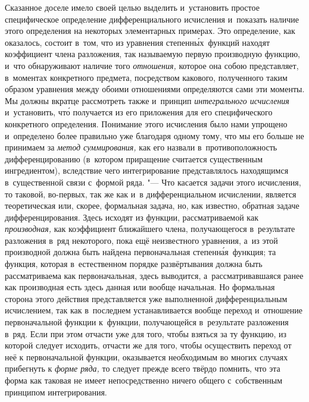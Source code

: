 Сказанное доселе имело своей целью выделить и~установить простое специфическое
определение дифференциального исчисления и~показать наличие этого определения
на некоторых элементарных примерах. Это определение, как оказалось, состоит
в~том, что из уравнения степенн\'{ы}х~функций находят коэффициент члена разложения,
так называемую первую производную функцию, и~что обнаруживают наличие того
{\em отношения,} которое она собою представляет, в~моментах конкретного
предмета, посредством какового, полученного таким образом уравнения между
обоими отношениями определяются сами эти моменты. Мы должны вкратце рассмотреть
также и~принцип {\em интегрального исчисления} и~установить, чт\'{о} получается из
его приложения для его специфического конкретного определения. Понимание этого
исчисления было нами упрощено и~определено более правильно уже благодаря одному
тому, что мы его больше не принимаем за {\em метод суммирования,} как его
назвали в~противоположность дифференцированию (в~котором приращение считается
существенным ингредиентом), вследствие чего интегрирование представлялось
находящимся в~существенной связи с~формой ряда. "--- Что касается задачи этого
исчисления, то таковой, во-первых, так же как и~в дифференциальном исчислении,
является теоретическая или, скорее, формальная задача, но, как известно,
обратная задаче дифференцирования. Здесь исходят из функции, рассматриваемой
как {\em производная,} как коэффициент ближайшего члена, получающегося
в~результате разложения в~ряд некоторого, пока ещё неизвестного уравнения, а~из
этой производной должна быть найдена первоначальная степенн\'{а}я~функция; та
функция, которая в~естественном \label{bkm:bm53b}порядке развёртывания должна
быть рассматриваема как первоначальная, здесь выводится, а~рассматривавшаяся
ранее как производная есть здесь данная или вообще начальная. Но формальная
сторона этого действия представляется уже выполненной дифференциальным
исчислением, так как в~последнем устанавливается вообще переход и~отношение
первоначальной функции к~функции, получающейся в~результате разложения в~ряд.
Если при этом отчасти уже для того, чтобы взяться за ту функцию, из которой
следует исходить, отчасти же для того, чтобы осуществить переход от неё
к первоначальной функции, оказывается необходимым во многих случаях прибегнуть
к {\em форме ряда,} то следует прежде всего твёрдо помнить, что эта форма как
таковая не имеет непосредственно ничего общего с~собственным принципом
интегрирования.

